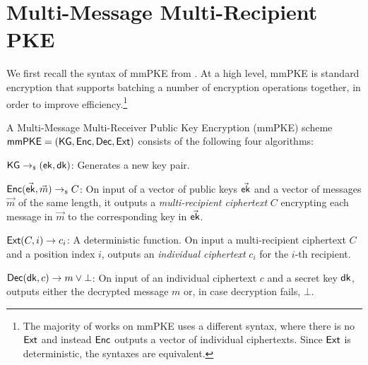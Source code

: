 \section{Multi-Message Multi-Recipient PKE}\label{sec:mmpke}
We first recall the syntax of mmPKE from \cite{PKC:BelBolSta03}. At a high level, mmPKE is standard encryption that
supports batching a number of encryption operations together, in order to improve efficiency.\footnote{The majority of
  works on mmPKE uses a different syntax, where there is no ${\mathsf{Ext}}$ and instead ${\mathsf{Enc}}$ outputs a vector of
  individual ciphertexts. Since ${\mathsf{Ext}}$ is deterministic, the syntaxes are equivalent.}%
%
%
\begin{definition}[\mmPKE]
  A Multi-Message Multi-Receiver Public Key Encryption (mmPKE) scheme ${\mathsf{mmPKE}} = \allowbreak({\mathsf{KG}},\allowbreak {\ensuremath{\mathsf{Enc}}},\allowbreak {\ensuremath{\mathsf{Dec}}}, {\mathsf{Ext}})$ consists of the following four algorithms:
  \begin{description}[align=left, nosep]
  \item[]${\mathsf{KG}} \rightarrow_{\scriptscriptstyle\$} ({\mathsf{ek}}, {\mathsf{dk}})$: Generates a new key pair.
  \item[]${\mathsf{Enc}}(\vec{{\mathsf{ek}}}, \vec{m})\rightarrow_{\scriptscriptstyle\$} C$: On input of a vector of
    public keys $\vec{{\mathsf{ek}}}$ and a vector of messages $\vec{m}$ of the same length, it outputs a \emph{multi-recipient ciphertext} $C$ encrypting each message in $\vec{m}$ to the corresponding key in $\vec{{\mathsf{ek}}}$.
  \item[]${\mathsf{Ext}}(C, i)\rightarrow c_i$: A deterministic function. On input a multi-recipient ciphertext $C$ and a position index $i$, outputs an \emph{individual ciphertext} $c_i$ for the $i$-th recipient.
  \item[]${\mathsf{Dec}}({\mathsf{dk}},c)\rightarrow m\vee\bot$: On input of an individual ciphertext $c$ and a secret key ${\mathsf{dk}}$, outputs either the decrypted message $m$ or, in case decryption fails, $\bot$.
  \end{description}
\end{definition}

